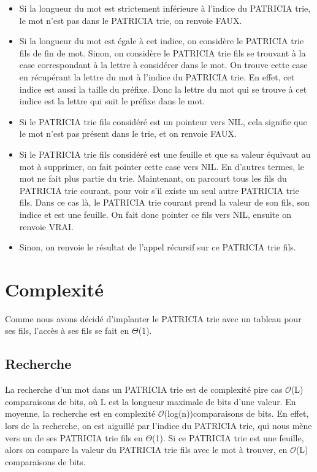 \documentclass[a4paper,12pt]{report}
\begin{document}
\begin{itemize}
 \item Si la longueur du mot est strictement inférieure à l'indice du PATRICIA trie, le mot n'est pas dans le PATRICIA trie, on renvoie FAUX.
 \item Si la longueur du mot est égale à cet indice, on considère le PATRICIA trie fils de fin de mot. Sinon, on considère le PATRICIA trie fils se trouvant à la case correspondant à la lettre à considérer dans le mot. On trouve cette case en récupérant la lettre du mot à l'indice du PATRICIA trie. En effet, cet indice est aussi la taille du préfixe. Donc la lettre du mot qui se trouve à cet indice est la lettre qui suit le préfixe dans le mot. 
 \item Si le PATRICIA trie fils considéré est un pointeur vers NIL, cela signifie que le mot n'est pas présent dans le trie, et on renvoie FAUX.
 \item Si le PATRICIA trie fils considéré est une feuille et que sa valeur équivaut au mot à supprimer, on fait pointer cette case vers NIL. En d'autres termes, le mot ne fait plus partie du trie. Maintenant, on parcourt tous les fils du PATRICIA trie courant, pour voir s'il existe un seul autre PATRICIA trie fils. Dans ce cas là, le PATRICIA trie courant prend la valeur de son fils, son indice et est une feuille. On fait donc pointer ce fils vers NIL, ensuite on renvoie VRAI.
 \item Sinon, on renvoie le résultat de l'appel récursif sur ce PATRICIA trie fils.
\end{itemize}

\section{Complexité}

Comme nous avons décidé d'implanter le PATRICIA trie avec un tableau pour ses fils, l'accès à ses fils se fait en $\Theta$(1).

\subsection{Recherche}
La recherche d'un mot dans un PATRICIA trie est de complexité pire cas $\mathcal{O}$(L) comparaisons de bits, où L est la longueur maximale de bits d'une valeur.
En moyenne, la recherche est en complexité $\mathcal{O}$(log(n))comparaisons de bits.
En effet, lors de la recherche, on est aiguillé par l'indice du PATRICIA trie, qui nous mène vers un de ses PATRICIA trie fils en $\Theta$(1). Si ce PATRICIA trie est une feuille, alors on compare la valeur du PATRICIA trie fils avec le mot à trouver, en $\mathcal{O}$(L) comparaisons de bits.
\end{document}
